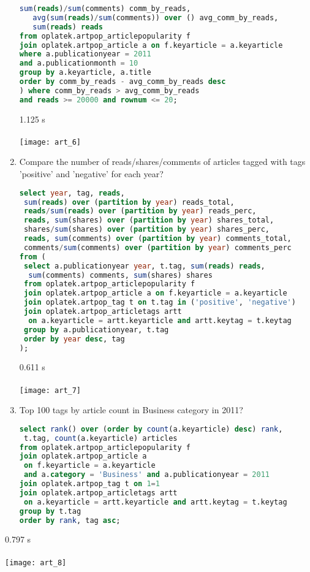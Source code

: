 \begin{enumerate}
\begin{lstlisting}[language=sql]
   sum(reads)/sum(comments) comm_by_reads,
   avg(sum(reads)/sum(comments)) over () avg_comm_by_reads,
   sum(reads) reads
from oplatek.artpop_articlepopularity f
join oplatek.artpop_article a on f.keyarticle = a.keyarticle
where a.publicationyear = 2011 
and a.publicationmonth = 10
group by a.keyarticle, a.title
order by comm_by_reads - avg_comm_by_reads desc
) where comm_by_reads > avg_comm_by_reads 
and reads >= 20000 and rownum <= 20;
\end{lstlisting}
     1.125 s\\ \\
      \texttt{[image: art\_6]}
\item    Compare the number of reads/shares/comments of articles tagged with tags 'positive' and 'negative' for each year?
\begin{lstlisting}[language=sql] 
select year, tag, reads, 
 sum(reads) over (partition by year) reads_total, 
 reads/sum(reads) over (partition by year) reads_perc,
 reads, sum(shares) over (partition by year) shares_total, 
 shares/sum(shares) over (partition by year) shares_perc,
 reads, sum(comments) over (partition by year) comments_total, 
 comments/sum(comments) over (partition by year) comments_perc
from (
 select a.publicationyear year, t.tag, sum(reads) reads, 
  sum(comments) comments, sum(shares) shares
 from oplatek.artpop_articlepopularity f
 join oplatek.artpop_article a on f.keyarticle = a.keyarticle
 join oplatek.artpop_tag t on t.tag in ('positive', 'negative')
 join oplatek.artpop_articletags artt 
  on a.keyarticle = artt.keyarticle and artt.keytag = t.keytag 
 group by a.publicationyear, t.tag
 order by year desc, tag
);
\end{lstlisting}
     0.611 s\\ \\
      \texttt{[image: art\_7]}
\item   Top 100 tags by article count in Business category in 2011?
\begin{lstlisting}[language=sql] 
select rank() over (order by count(a.keyarticle) desc) rank, 
 t.tag, count(a.keyarticle) articles
from oplatek.artpop_articlepopularity f
join oplatek.artpop_article a 
 on f.keyarticle = a.keyarticle 
 and a.category = 'Business' and a.publicationyear = 2011
join oplatek.artpop_tag t on 1=1
join oplatek.artpop_articletags artt 
 on a.keyarticle = artt.keyarticle and artt.keytag = t.keytag
group by t.tag
order by rank, tag asc;
\end{lstlisting}
\end{enumerate}
     0.797 s\\ \\
      \texttt{[image: art\_8]}
